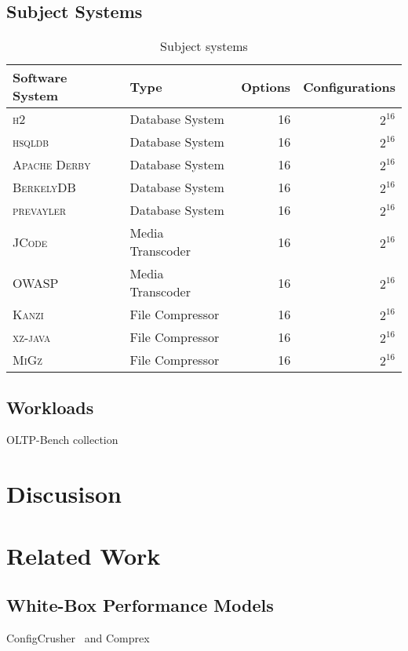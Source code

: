 \documentclass[conference]{IEEEtran}
\begin{document}
\subsection{Subject Systems}
\begin{table}
	\caption{Subject systems}
	\begin{tabular}{llrr}
		\toprule
		\textbf{Software System} & \textbf{Type} & \textbf{Options} & \textbf{Configurations} \\
		\midrule
		\textsc{h2} & Database System & 16 & $2^{16}$\\
		\textsc{hsqldb} & Database System & 16 & $2^{16}$\\
		\textsc{Apache Derby} & Database System & 16 & $2^{16}$\\
		\textsc{BerkelyDB} & Database System & 16 & $2^{16}$\\
		\textsc{prevayler} & Database System & 16 & $2^{16}$\\
		\midrule
		\textsc{JCode} & Media Transcoder & 16 & $2^{16}$\\
		\textsc{OWASP} & Media Transcoder & 16 & $2^{16}$\\
		\midrule
		\textsc{Kanzi} & File Compressor & 16 & $2^{16}$\\
		\textsc{xz-java} & File Compressor & 16 & $2^{16}$\\
		\textsc{MiGz} & File Compressor & 16 & $2^{16}$\\
		\bottomrule
	\end{tabular}
\end{table}

\subsection{Workloads}
OLTP-Bench collection~\cite{difallah_oltp_2013}

\section{Discusison}
\section{Related Work}
\subsection{White-Box Performance Models}
ConfigCrusher~\cite{velez_2020_configcrusher_jase} and Comprex~\cite{velez_comprex_2021}
\end{document}
